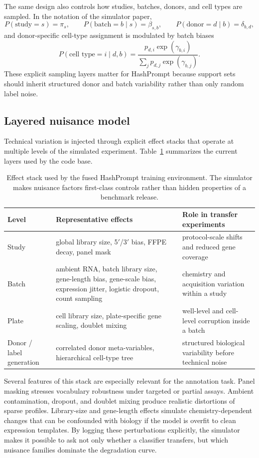 \documentclass{article}
\begin{document}
The same design also controls how studies, batches, donors, and cell types are sampled. In the notation of the simulator paper,
\[
P(\text{study}=s)=\pi_s,\qquad P(\text{batch}=b\mid s)=\beta_{s,b},\qquad P(\text{donor}=d\mid b)=\delta_{b,d},
\]
and donor-specific cell-type assignment is modulated by batch biases
\[
P(\text{cell type}=i\mid d,b)=\frac{p_{d,i}\exp(\gamma_{b,i})}{\sum_j p_{d,j}\exp(\gamma_{b,j})}.
\]
These explicit sampling layers matter for HashPrompt because support sets should inherit structured donor and batch variability rather than only random label noise.

\subsection{Layered nuisance model}
Technical variation is injected through explicit effect stacks that operate at multiple levels of the simulated experiment. Table~\ref{tab:effect_stack} summarizes the current layers used by the code base.

\begin{table}[t]
    \centering
    \small
    \begin{tabular}{lll}
        \toprule
        \textbf{Level} & \textbf{Representative effects} & \textbf{Role in transfer experiments} \\
        \midrule
        Study & global library size, 5$'$/$3'$ bias, FFPE decay, panel mask & protocol-scale shifts and reduced gene coverage \\
        Batch & ambient RNA, batch library size, gene-length bias, gene-scale bias, expression jitter, logistic dropout, count sampling & chemistry and acquisition variation within a study \\
        Plate & cell library size, plate-specific gene scaling, doublet mixing & well-level and cell-level corruption inside a batch \\
        Donor / label generation & correlated donor meta-variables, hierarchical cell-type tree & structured biological variability before technical noise \\
        \bottomrule
    \end{tabular}
    \caption{Effect stack used by the fused HashPrompt training environment. The simulator makes nuisance factors first-class controls rather than hidden properties of a benchmark release.}
    \label{tab:effect_stack}
\end{table}

Several features of this stack are especially relevant for the annotation task. Panel masking stresses vocabulary robustness under targeted or partial assays. Ambient contamination, dropout, and doublet mixing produce realistic distortions of sparse profiles. Library-size and gene-length effects simulate chemistry-dependent changes that can be confounded with biology if the model is overfit to clean expression templates. By logging these perturbations explicitly, the simulator makes it possible to ask not only whether a classifier transfers, but which nuisance families dominate the degradation curve.
\end{document}
